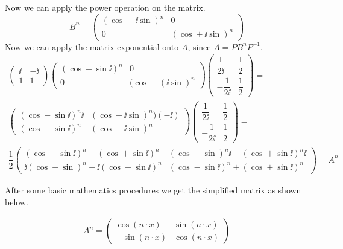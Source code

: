 Now we can apply the power operation on the matrix.
\begin{equation*}
B^n = \left( \begin{array}{cc}
(\cos - \ii \sin)^n & 0\\
 0 & (\cos + \ii \sin )^n
\end{array}
\right)
\end{equation*}
Now we can apply the matrix exponential onto $A$, since $A = PB^{n}P^{-1}$.
\begin{gather*}
\left( \begin{array}{cc}
\ii & - \ii \\
1 & 1
\end{array}
\right)
\left( \begin{array}{cc}
(\cos - \sin \ii)^n & 0 \\
0 & (\cos + (\ii \sin )^n
\end{array}
\right)
\left( \begin{array}{cc}
\dfrac{1}{2\ii} & \dfrac{1}{2} \\
-\dfrac{1}{2 \ii} & \dfrac{1}{2}
\end{array}
\right)
=\\
\left( \begin{array}{cc}
(\cos - \sin \ii)^n \ii & (\cos + \ii \sin)^n)(-\ii) \\
(\cos - \sin \ii)^n & (\cos + \ii \sin)^n 
\end{array}
\right)
\left( \begin{array}{cc}
\dfrac{1}{2\ii} & \dfrac{1}{2} \\
-\dfrac{1}{2 \ii} & \dfrac{1}{2}
\end{array}
\right)
=\\
\dfrac{1}{2}
\left( \begin{array}{cc}
\left( \cos - \sin \ii \right)^n + (\cos + \sin \ii )^n & (\cos - \sin)^n \ii - (\cos + \sin \ii)^n \ii \\ 
\ii (\cos + \sin)^n  - \ii (\cos - \sin \ii )^n & \left( \cos - \sin \ii \right)^n + (\cos + \sin \ii )^n 
\end{array}
\right)
=
A^n
\end{gather*}

After some basic mathematics procedures we get the simplified matrix as shown below.

\begin{gather}
A^n = 
\left( 
	\begin{array}{cc}
		\cos(n\cdot x) & \sin(n\cdot x)\\
		-\sin(n\cdot x) & \cos(n\cdot x)
	\end{array}
\right)
\end{gather}

